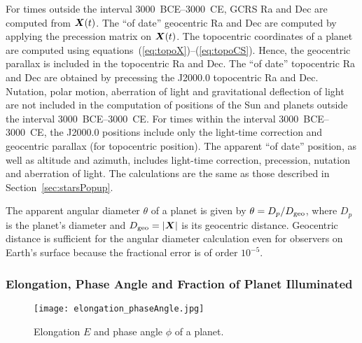 \documentclass[12pt]{article}
\newcommand{\ve}[1]{\mbox{\boldmath $#1$}}
\begin{document}
For times outside the interval 3000~BCE--3000~CE, 
GCRS Ra and Dec are computed from $\ve{X}(t)$. The ``of date'' geocentric Ra and Dec are 
computed by applying the precession matrix on $\ve{X}(t)$. 
The topocentric coordinates of a planet are computed using 
equations~(\ref{eq:topoX})--(\ref{eq:topoCS}). Hence, the geocentric parallax 
is included in the topocentric Ra and Dec. The ``of date'' topocentric 
Ra and Dec are obtained by precessing the J2000.0 topocentric Ra and Dec.
Nutation, polar motion, aberration of light 
and gravitational deflection of light are not included in the computation of 
positions of the Sun and planets outside the interval 3000~BCE--3000~CE. 
For times within the interval 3000~BCE--3000~CE, the J2000.0 positions 
include only the light-time correction and geocentric parallax (for topocentric 
position). The apparent ``of date'' position, as well as altitude and azimuth, 
includes light-time correction, 
precession, nutation and aberration of light. The calculations are the same 
as those described in Section~\ref{sec:starsPopup}.

The apparent angular diameter $\theta$ of a planet is given by 
$\theta = D_p/D_{\rm geo}$,
where $D_p$ is the planet's diameter and $D_{\rm geo}=|\ve{X}|$ is 
its geocentric distance. Geocentric distance is sufficient for the 
angular diameter calculation even for observers on Earth's surface because 
the fractional error is of order $10^{-5}$.

\subsubsection{Elongation, Phase Angle and Fraction of Planet Illuminated}

\begin{figure}[h]
\begin{center}
\texttt{[image: elongation\_phaseAngle.jpg]}
\end{center}
\caption{Elongation $E$ and phase angle $\phi$ of a planet.}
\label{fig:ElongPhaseAng}
\end{figure}
\end{document}
